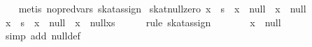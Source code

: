 \begin{isabellebody}
%
\isadelimproof
\ \ %
\endisadelimproof
%
\isatagproof
{}\isamarkupfalse%
\ {}metis\ no{}pred{}vars\ skat{}assign{}{}%
\endisatagproof
{\isafoldproof}%
%
\isadelimproof
\isanewline
%
\endisadelimproof
\isanewline
{}\isamarkupfalse%
\ skat{}null{}zero{}\ {}{}x\ {}{}\ s\ {}\ x\ {}{}\ null{}\ {}\ {}x\ {}{}\ null{}{}\isanewline
%
\isadelimproof
%
\endisadelimproof
%
\isatagproof
{}\isamarkupfalse%
\ {}\isanewline
\ \ \isamarkupfalse%
\ {}{}x\ {}{}\ s\ {}\ x\ {}{}\ null{}\ {}\ {}x\ {}{}\ null{}x{}s{}{}{}\isanewline
\ \ \ \ \isamarkupfalse%
\ {}rule\ skat{}assign{}{}\isanewline
\ \ \isamarkupfalse%
\ \isamarkupfalse%
\ {}{}{}{}\ {}\ x\ {}{}\ null{}\isanewline
\ \ \ \ \isamarkupfalse%
\ {}simp\ add{}\ null{}def{}\isanewline

\end{isabellebody}
